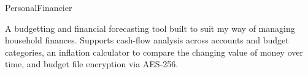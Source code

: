 \documentclass{portfolio}
\begin{document}
  \vfillForced

  
  \vfillForced
  
  \begin{ContactDetails}
  \end{ContactDetails}
  
  \vfillForced

  
  \begin{Projects}
    \begin{Project}{PersonalFinancier}
      \begin{ProjectOverview}
        A budgetting and financial forecasting tool built to suit my way of managing household finances.
        Supports cash-flow analysis across accounts and budget categories, an inflation calculator to compare
        the changing value of money over time, and budget file encryption via AES-256. 
      \end{ProjectOverview}
    \end{Project}
  \end{Projects}
  \vfillForced
\end{document}

